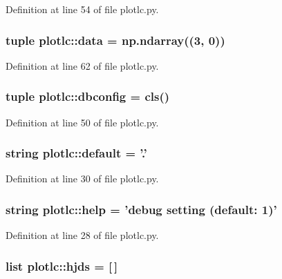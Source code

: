 Definition at line 54 of file plotlc.py.

\hypertarget{namespaceplotlc_a4a20eb1a28e7335a93020398cadede85}{
\subsubsection[{data}]{\setlength{\rightskip}{0pt plus 5cm}tuple {\bf plotlc::data} = np.ndarray((3, 0))}}
\label{namespaceplotlc_a4a20eb1a28e7335a93020398cadede85}


Definition at line 62 of file plotlc.py.

\hypertarget{namespaceplotlc_ad02f25ea0c738c3d1867127ee20ae0a2}{
\subsubsection[{dbconfig}]{\setlength{\rightskip}{0pt plus 5cm}tuple {\bf plotlc::dbconfig} = {\bf cls}()}}
\label{namespaceplotlc_ad02f25ea0c738c3d1867127ee20ae0a2}


Definition at line 50 of file plotlc.py.

\hypertarget{namespaceplotlc_a78b903191c52c9ae7de23c57e216c537}{
\subsubsection[{default}]{\setlength{\rightskip}{0pt plus 5cm}string {\bf plotlc::default} = '.'}}
\label{namespaceplotlc_a78b903191c52c9ae7de23c57e216c537}


Definition at line 30 of file plotlc.py.

\hypertarget{namespaceplotlc_a19d5157c64a1c0f983eb1b6ac77d28ad}{
\subsubsection[{help}]{\setlength{\rightskip}{0pt plus 5cm}string {\bf plotlc::help} = 'debug setting (default: 1)'}}
\label{namespaceplotlc_a19d5157c64a1c0f983eb1b6ac77d28ad}


Definition at line 28 of file plotlc.py.

\hypertarget{namespaceplotlc_a6d96382c484c88c062cee8524f2b3b4a}{
\subsubsection[{hjds}]{\setlength{\rightskip}{0pt plus 5cm}list {\bf plotlc::hjds} = \mbox{[}$\,$\mbox{]}}}
\label{namespaceplotlc_a6d96382c484c88c062cee8524f2b3b4a}


